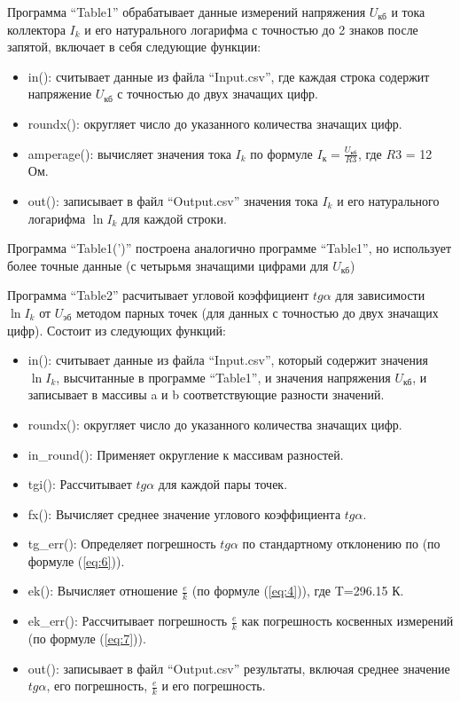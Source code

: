 Программа ``Table1'' обрабатывает данные измерений напряжения $U_{\text{кб}}$ и тока коллектора $I_k$ и его натурального логарифма с точностью до 2 знаков после запятой, включает в себя следующие функции:
\begin{itemize}
\item in(): считывает данные из файла ``Input.csv'', где каждая строка содержит напряжение $U_{\text{кб}}$ с точностью до двух значащих цифр.
\item roundx(): округляет число до указанного количества значащих цифр.
\item amperage(): вычисляет значения тока $I_k$ по формуле $I_{\text{к}}=\frac{U_{\text{кб}}}{R3}$, где $R3$ = 12 Ом.
\item out(): записывает в файл ``Output.csv'' значения тока $I_k$ и его натурального логарифма $\ln I_k$ для каждой строки.
\end{itemize}

Программа ``Table1(')'' построена аналогично программе ``Table1'', но использует более точные данные (с четырьмя значащими цифрами для $U_{\text{кб}}$)

Программа ``Table2'' расчитывает угловой коэффициент $tg{\alpha}$ для зависимости $\ln I_k$ от $U_{\text{эб}}$ методом парных точек (для данных с точностью до двух значащих цифр). Состоит из следующих функций:

\begin{itemize}
\item in(): считывает данные из файла ``Input.csv'', который содержит значения $\ln I_k$, высчитанные в программе ``Table1'', и значения напряжения $U_{\text{кб}}$, и записывает в массивы a и b соответствующие разности значений.
\item roundx(): округляет число до указанного количества значащих цифр.
\item in\_round(): Применяет округление к массивам разностей.
\item tgi(): Рассчитывает $tg{\alpha}$ для каждой пары точек.
\item fx(): Вычисляет среднее значение углового коэффициента $tg{\alpha}$.
\item tg\_err(): Определяет погрешность $tg{\alpha}$ по стандартному отклонению по (по формуле (\ref{eq:6})).
\item ek(): Вычисляет отношение $\frac{e}{k}$ (по формуле (\ref{eq:4})), где T=296.15 К.
\item ek\_err(): Рассчитывает погрешность $\frac{e}{k}$ как погрешность косвенных измерений (по формуле (\ref{eq:7})).
\item out(): записывает в файл ``Output.csv'' результаты, включая среднее значение $tg{\alpha}$, его погрешность, $\frac{e}{k}$ и его погрешность.
\end{itemize}

